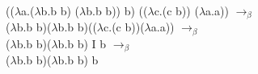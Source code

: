 \documentclass[12pt]{article}
\begin{document}
    (($\lambda$a.($\lambda$b.b b) ($\lambda$b.b b)) b) (($\lambda$c.(c b)) ($\lambda$a.a)) $\rightarrow_{\beta}$\\
    ($\lambda$b.b b)($\lambda$b.b b)(($\lambda$c.(c b))($\lambda$a.a)) $\rightarrow_{\beta}$\\
    ($\lambda$b.b b)($\lambda$b.b b) I b $\rightarrow_{\beta}$\\
    ($\lambda$b.b b)($\lambda$b.b b) b
    
\end{document}
